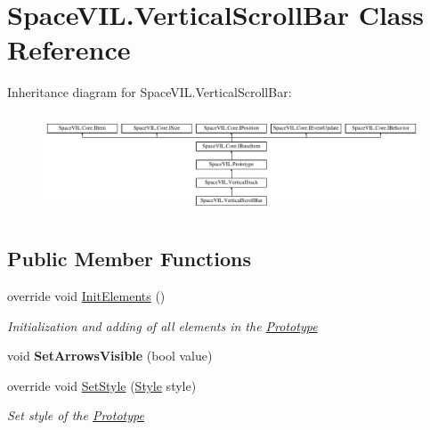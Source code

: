 \hypertarget{class_space_v_i_l_1_1_vertical_scroll_bar}{}\section{Space\+V\+I\+L.\+Vertical\+Scroll\+Bar Class Reference}
\label{class_space_v_i_l_1_1_vertical_scroll_bar}
Inheritance diagram for Space\+V\+I\+L.\+Vertical\+Scroll\+Bar\+:\begin{figure}[H]
\begin{center}
\leavevmode
\includegraphics[height=3.027027cm]{class_space_v_i_l_1_1_vertical_scroll_bar}
\end{center}
\end{figure}
\subsection*{Public Member Functions}
\begin{DoxyCompactItemize}
\item 
override void \mbox{\hyperlink{class_space_v_i_l_1_1_vertical_scroll_bar_aa74f074945d0b53b3a2dc0eb97904ce1}{Init\+Elements}} ()
\begin{DoxyCompactList}\small\item\em Initialization and adding of all elements in the \mbox{\hyperlink{class_space_v_i_l_1_1_prototype}{Prototype}} \end{DoxyCompactList}\item 
\mbox{\label{class_space_v_i_l_1_1_vertical_scroll_bar_a0afe09bf320889045661c5cd24fcf4ad}} 
void {\bfseries Set\+Arrows\+Visible} (bool value)
\item 
override void \mbox{\hyperlink{class_space_v_i_l_1_1_vertical_scroll_bar_a94bfbdb137de9b7301e6e07074eb2069}{Set\+Style}} (\mbox{\hyperlink{class_space_v_i_l_1_1_decorations_1_1_style}{Style}} style)
\begin{DoxyCompactList}\small\item\em Set style of the \mbox{\hyperlink{class_space_v_i_l_1_1_prototype}{Prototype}} \end{DoxyCompactList}\end{DoxyCompactItemize}
